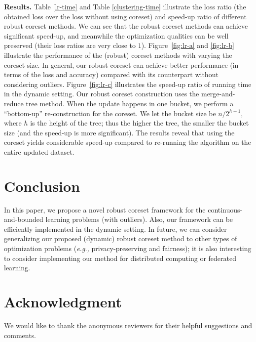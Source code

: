 \documentclass{article}
\begin{document}
\textbf{Results.} 
Table \ref{lr-time} and Table \ref{clustering-time} illustrate the loss ratio (the obtained loss over the loss without using coreset) and speed-up ratio of different robust coreset methods. We can see that the robust coreset methods can achieve significant speed-up, and meanwhile the optimization qualities can be well preserved (their loss ratios are very close to $1$). 
Figure~\ref{fig:lr-a} and \ref{fig:lr-b} illustrate the performance of the (robust) coreset methods with varying the coreset size. In general, our robust coreset can achieve better performance (in terms of the loss and accuracy) compared with its counterpart  without considering outliers. 
Figure~\ref{fig:lr-c} illustrates the speed-up ratio of running time in the dynamic setting. Our robust coreset construction uses the merge-and-reduce tree method. When the update happens in one bucket, we perform a ``bottom-up'' re-construction for the coreset. We let the bucket size be $ n/2^{h-1} $, where $ h $ is the height of the tree; thus the higher the tree, the smaller the bucket size (and the speed-up is more significant). The results reveal that using the coreset yields considerable speed-up compared to re-running the algorithm on the entire updated dataset.  


\section{Conclusion}\label{conclusion}
In this paper, we propose a novel robust coreset framework for the continuous-and-bounded learning problems (with outliers). Also, our framework can be efficiently implemented in the dynamic setting. In future, we can consider generalizing our proposed (dynamic) robust coreset method to other types of optimization problems ({\em e.g.,} privacy-preserving and fairness); it is also interesting to consider implementing our method for distributed computing or federated learning. 

\section*{Acknowledgment}
We would like to thank the anonymous reviewers for their helpful suggestions and comments.








\end{document}
